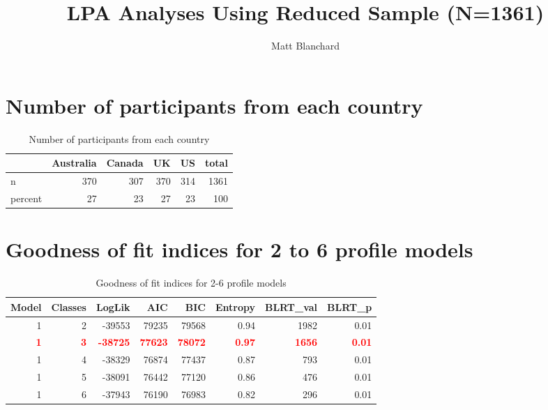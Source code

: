 \documentclass[]{article}
\title{LPA Analyses Using Reduced Sample (N=1361)}
\author{Matt Blanchard}
\date{}
\begin{document}
\maketitle

\hypertarget{number-of-participants-from-each-country}{%
\section{Number of participants from each
country}\label{number-of-participants-from-each-country}}

\begin{table}[H]

\caption{\label{tab:unnamed-chunk-2}Number of participants from each country}
\centering
\fontsize{6}{8}\selectfont
\begin{tabular}[t]{lrrrrr}
\toprule
  & Australia & Canada & UK & US & total\\
\midrule
n & 370 & 307 & 370 & 314 & 1361\\
percent & 27 & 23 & 27 & 23 & 100\\
\bottomrule
\end{tabular}
\end{table}

\hypertarget{goodness-of-fit-indices-for-2-to-6-profile-models}{%
\section{Goodness of fit indices for 2 to 6 profile
models}\label{goodness-of-fit-indices-for-2-to-6-profile-models}}

\begin{table}[H]

\caption{\label{tab:unnamed-chunk-3}Goodness of fit indices for 2-6 profile models}
\centering
\fontsize{6}{8}\selectfont
\begin{tabular}[t]{rrrrrrrr}
\toprule
Model & Classes & LogLik & AIC & BIC & Entropy & BLRT\_val & BLRT\_p\\
\midrule
1 & 2 & -39553 & 79235 & 79568 & 0.94 & 1982 & 0.01\\
\textcolor{red}{\textbf{1}} & \textcolor{red}{\textbf{3}} & \textcolor{red}{\textbf{-38725}} & \textcolor{red}{\textbf{77623}} & \textcolor{red}{\textbf{78072}} & \textcolor{red}{\textbf{0.97}} & \textcolor{red}{\textbf{1656}} & \textcolor{red}{\textbf{0.01}}\\
1 & 4 & -38329 & 76874 & 77437 & 0.87 & 793 & 0.01\\
1 & 5 & -38091 & 76442 & 77120 & 0.86 & 476 & 0.01\\
1 & 6 & -37943 & 76190 & 76983 & 0.82 & 296 & 0.01\\
\bottomrule
\end{tabular}
\end{table}
\end{document}
